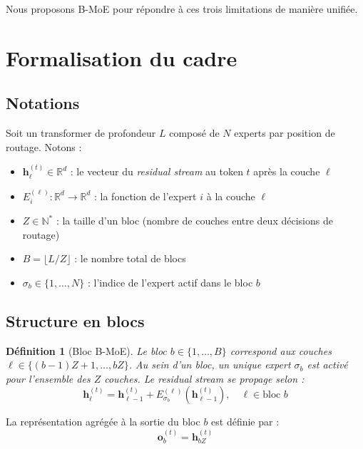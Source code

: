\documentclass[10pt,a4paper]{article}
\newtheorem{definition}{Définition}
\begin{document}
Nous proposons B-MoE pour répondre à ces trois limitations de manière unifiée.

\section{Formalisation du cadre}

\subsection{Notations}

Soit un transformer de profondeur $L$ composé de $N$ experts par position de routage. Notons :
\begin{itemize}
  \item $\mathbf{h}_\ell^{(t)} \in \mathbb{R}^d$ : le vecteur du \textit{residual stream} au token $t$ après la couche $\ell$
  \item $E_i^{(\ell)} : \mathbb{R}^d \to \mathbb{R}^d$ : la fonction de l'expert $i$ à la couche $\ell$
  \item $Z \in \mathbb{N}^*$ : la taille d'un bloc (nombre de couches entre deux décisions de routage)
  \item $B = \lfloor L/Z \rfloor$ : le nombre total de blocs
  \item $\sigma_b \in \{1, \ldots, N\}$ : l'indice de l'expert actif dans le bloc $b$
\end{itemize}

\subsection{Structure en blocs}

\begin{definition}[Bloc B-MoE]
Le bloc $b \in \{1, \ldots, B\}$ correspond aux couches $\ell \in \{(b-1)Z+1, \ldots, bZ\}$. Au sein d'un bloc, un unique expert $\sigma_b$ est activé pour l'ensemble des $Z$ couches. Le residual stream se propage selon :
\begin{equation}
  \mathbf{h}_\ell^{(t)} = \mathbf{h}_{\ell-1}^{(t)} + E_{\sigma_b}^{(\ell)}\!\left(\mathbf{h}_{\ell-1}^{(t)}\right), \quad \ell \in \text{bloc } b
\end{equation}
\end{definition}

La représentation agrégée à la sortie du bloc $b$ est définie par :
\begin{equation}
  \mathbf{o}_b^{(t)} = \mathbf{h}_{bZ}^{(t)}
\end{equation}
\end{document}
